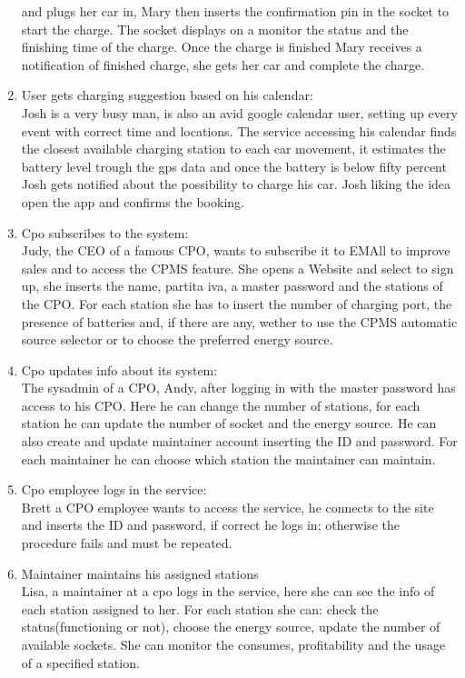 \begin{enumerate}[label=S\arabic*]
            and plugs her car in, Mary then inserts the confirmation pin in the socket to start the charge.
            The socket displays on a monitor the status and the finishing time of the charge.
            Once the charge is finished Mary receives a notification of finished charge,
            she gets her car and complete the charge.
      \item User gets charging suggestion based on his calendar:\\
            Josh is a very busy man, is also an avid google calendar user,
            setting up every event with correct time and locations.
            The service accessing his calendar finds the closest available charging station to each car movement,
            it estimates the battery level trough the gps data and once the battery is below fifty percent Josh gets notified
            about the possibility to charge his car.
            Josh liking the idea open the app and confirms the booking.
      \item Cpo subscribes to the system:\\
            Judy, the CEO of a famous CPO, wants to subscribe it to EMAll to improve sales and to access the CPMS feature.
            She opens a Website and select to sign up, she inserts the name, partita iva, a master password and the stations of the CPO.
            For each station she has to insert the number of charging port, the presence of batteries and, if there are any,
            wether to use the CPMS automatic source selector or to choose the preferred energy source.
      \item Cpo updates info about its system:\\
            The sysadmin of a CPO, Andy, after logging in with the master password has access to his CPO.
            Here he can change the number of stations, for each station he can update the number of socket and the energy source.
            He can also create and update maintainer account inserting the ID and password. For each maintainer he can choose which station the maintainer can maintain.
      \item Cpo employee logs in the service:\\
            Brett a CPO employee wants to access the service, he connects to the site and inserts the ID
            and password, if correct he logs in; otherwise the procedure fails and must be repeated.
      \item Maintainer maintains his assigned stations\\
            Lisa, a maintainer at a cpo logs in the service, here she can see the info of each station assigned to her.
            For each station she can: check the status(functioning or not), choose the energy source, update the number of available sockets.
            She can monitor the consumes, profitability and the usage of a specified station.
\end{enumerate}

